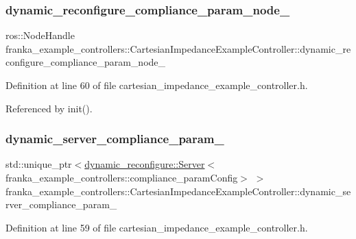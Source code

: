 \subsubsection{\texorpdfstring{dynamic\+\_\+reconfigure\+\_\+compliance\+\_\+param\+\_\+node\+\_\+}{dynamic\_reconfigure\_compliance\_param\_node\_}}
{\footnotesize\ttfamily ros\+::\+Node\+Handle franka\+\_\+example\+\_\+controllers\+::\+Cartesian\+Impedance\+Example\+Controller\+::dynamic\+\_\+reconfigure\+\_\+compliance\+\_\+param\+\_\+node\+\_\+\hspace{0.3cm}{\ttfamily [private]}}



Definition at line 60 of file cartesian\+\_\+impedance\+\_\+example\+\_\+controller.\+h.



Referenced by init().

\mbox{\label{classfranka__example__controllers_1_1CartesianImpedanceExampleController_a43319973f57653a9d64bdafbeea2cf03}} 
\subsubsection{\texorpdfstring{dynamic\+\_\+server\+\_\+compliance\+\_\+param\+\_\+}{dynamic\_server\_compliance\_param\_}}
{\footnotesize\ttfamily std\+::unique\+\_\+ptr$<$\hyperlink{strikes__back_2servers_2led__action__server_2src_2led__action__server__node_8cpp_a2036ae39d23f8e14a2cc8ddcd46dea5a}{dynamic\+\_\+reconfigure\+::\+Server}$<$franka\+\_\+example\+\_\+controllers\+::compliance\+\_\+param\+Config$>$ $>$ franka\+\_\+example\+\_\+controllers\+::\+Cartesian\+Impedance\+Example\+Controller\+::dynamic\+\_\+server\+\_\+compliance\+\_\+param\+\_\+\hspace{0.3cm}{\ttfamily [private]}}



Definition at line 59 of file cartesian\+\_\+impedance\+\_\+example\+\_\+controller.\+h.



